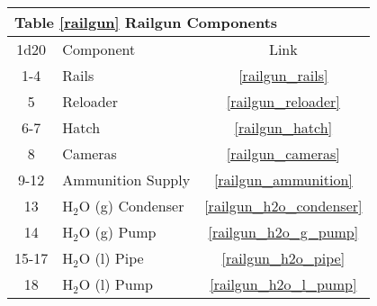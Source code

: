 \documentclass[a4paper]{article}
\begin{document}
\vspace{0.5cm} \hspace{0.25\linewidth}
\begin{tabular}{@{} | c | l | c | @{}}
\toprule
\multicolumn{3}{|l|}{Table \ref{railgun} Railgun Components} \\
\toprule
1d20 & Component & Link \\
\midrule
1-4 & Rails & \ref{railgun_rails} \\
5 & Reloader & \ref{railgun_reloader} \\
6-7 & Hatch & \ref{railgun_hatch} \\
8 & Cameras & \ref{railgun_cameras} \\
9-12 & Ammunition Supply & \ref{railgun_ammunition} \\
\midrule
13 & H$_2$O (g) Condenser & \ref{railgun_h2o_condenser} \\
14 & H$_2$O (g) Pump & \ref{railgun_h2o_g_pump} \\
15-17 & H$_2$O (l) Pipe & \ref{railgun_h2o_pipe} \\
18 & H$_2$O (l) Pump & \ref{railgun_h2o_l_pump} \\
\bottomrule
\end{tabular}
\end{document}
